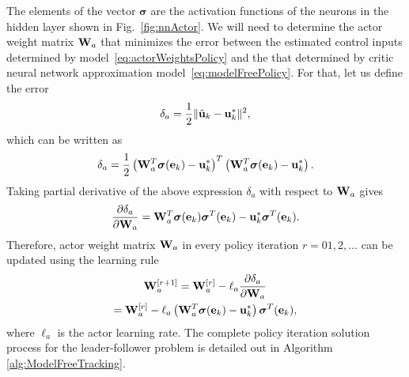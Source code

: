 \documentclass[conference]{IEEEtran}
\begin{document}
%
The elements of the vector $\bm{\sigma}$ are the activation functions of the neurons in the hidden layer shown in Fig.~\ref{fig:nnActor}. We will need to determine the actor weight matrix ${\bf W}_a$ that minimizes the error between the estimated control inputs determined by model~\eqref{eq:actorWeightsPolicy} and the that determined by critic neural network approximation model~\eqref{eq:modelFreePolicy}. For that, let us define the error %
%
\begin{align}
  \label{eq:deltaActor}
  \delta_a = \frac{1}{2}\|\hat{{\bf u}}_k - {\bf u}_k^*\|^2,
\end{align}
%
which can be written as %
%
\begin{align*}
  \delta_a = \frac{1}{2}\left( {\bf W}_a^T\bm{\sigma}({\bf e}_k) -  {\bf u}_k^*\right)^T\left( {\bf W}_a^T\bm{\sigma}({\bf e}_k) -  {\bf u}_k^*\right). 
\end{align*}
%
Taking partial derivative of the above expression $\delta_a$  with respect to ${\bf W}_a$ gives %
%
\begin{align*}
  \frac{\partial \delta_a}{\partial{\bf W}_a} = {\bf W}_a^T\bm{\sigma}({\bf e}_k)\bm{\sigma}^T({\bf e}_k) - {\bf u}_k^*\bm{\sigma}^T({\bf e}_k).
\end{align*}
%
Therefore, actor weight matrix ${\bf W}_a$ in every policy iteration $r = 01,2,\ldots$ can be updated using the learning rule %
%
\begin{multline}
  {\bf W}_a^{[r+1]} = {\bf W}_a^{[r]} - \ell_a\frac{\partial\delta_a}{\partial{\bf W}_a}\\
  = {\bf W}_a^{[r]} - \ell_a\left( {\bf W}_a^T\bm{\sigma}({\bf e}_k)-\mathbf{u}_k^* \right)\bm{\sigma}^T({\bf e}_k), 
 \label{eq:actorWeights}
 \end{multline}
 where $\ell_a$ is the actor learning rate.  The complete policy iteration solution process for the leader-follower problem is detailed out in Algorithm \ref{alg:ModelFreeTracking}. %
\end{document}
